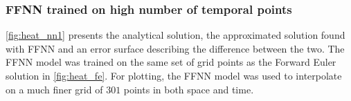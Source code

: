 \subsubsection{FFNN trained on high number of temporal points}


\autoref{fig:heat_nn1} presents the analytical solution, the approximated solution found with FFNN and an error surface describing the difference between the two. The FFNN model was trained on the same set of grid points as the Forward Euler solution in \autoref{fig:heat_fe}. For plotting, the FFNN model was used to interpolate on a much finer grid of $301$ points in both space and time. 

\begin{figure}[H]
\centering
{}
\qquad
{}

\end{figure}
